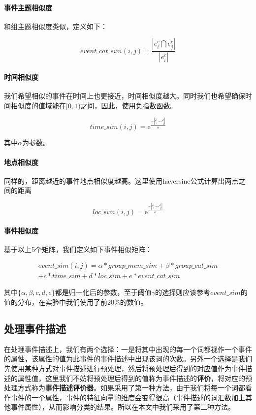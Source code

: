 \paragraph{事件主题相似度}

和组主题相似度类似，定义如下：

\begin{equation}
event\_cat\_sim(i,j)=\frac{|e_i^c\bigcap e_j^c|}{|e_i^c|}
\end{equation}

\paragraph{时间相似度}

我们希望相似的事件在时间上也更接近，时间相似度越大。同时我们也希望确保时间相似度的值域能在\([0,1)\)之间，因此，使用负指数函数。

\begin{equation}   
time\_sim(i,j)=\mathrm{e}^\frac{-|e_i^t-e_j^t|}{\alpha}
\end{equation}

其中\(\alpha\)为参数。

\paragraph{地点相似度}

同样的，距离越近的事件地点相似度越高。这里使用haversine公式计算出两点之间的距离

\begin{equation}   
loc\_sim(i,j)=\mathrm{e}^\frac{-|e_i^l-e_j^l|}{\alpha}
\end{equation}

\paragraph{事件相似度}
基于以上5个矩阵，我们定义如下事件相似矩阵：

\begin{multline}   
event\_sim(i,j)=\alpha*group\_mem\_sim+\beta*group\_cat\_sim
\\+{c}*time\_sim+{d}*loc\_sim+{e}*event\_cat\_sim
\end{multline}

其中\(\{\alpha,\beta,{c},{d},{e}\}\)都是归一化后的参数，至于阈值\(\gamma\)的选择则应该参考\(event\_sim\)的值的分布，在实验中我们使用了前20\%的数值。

\subsection{处理事件描述}
在处理事件描述上，我们有两个选择：一是将其中出现的每一个词都视作一个事件的属性，该属性的值为此事件的事件描述中出现该词的次数。另外一个选择是我们先使用某种方式对事件描述进行预处理，然后将预处理后得到的对应值作为事件描述的属性值，这里我们不妨将预处理后得到的值称为事件描述的\textbf{评价}，将对应的预处理方式称为\textbf{事件描述评价器}。如果采用了第一种方法，由于我们将每一个词都看作事件的一个属性，事件的特征向量的维度会变得很高（事件描述的词汇数加上其他事件属性），从而影响分类的结果。所以在本文中我们采用了第二种方法。

